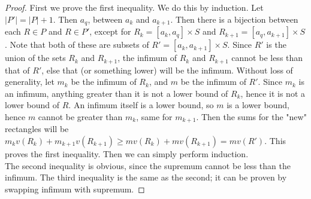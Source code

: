 \documentclass[12pt]{article}
\begin{document}
\begin{proof}
    First we prove the first inequality. We do this by induction. Let $|P'| = |P| + 1$. Then $a_q$, between $a_k$ and $a_{k+1}$. Then there is a bijection between each $R\in P$ and $R \in P'$, except for $R_k = [a_k,a_q] \times S$ and $R_{k+1} = [a_q,a_{k+1}] \times S$. Note that both of these are subsets of $R' = [a_k,a_{k+1}] \times S$. Since $R'$ is the union of the sets $R_k$ and $R_{k+1}$, the infimum of $R_k$ and $R_{k+1}$ cannot be less than that of $R'$, else that (or something lower) will be the infimum. Without loss of generality, let $m_k$ be the infimum of $R_k$, and $m$ be the infimum of $R'$. Since $m_k$ is an infimum, anything greater than it is not a lower bound of $R_k$, hence it is not a lower bound of $R$. An infimum itself is a lower bound, so $m$ is a lower bound, hence $m$ cannot be greater than $m_k$, same for $m_{k+1}$. Then the sums for the "new" rectangles will be $m_kv(R_k) + m_{k+1}v(R_{k+1}) \geq mv(R_k) + mv(R_{k+1}) = mv(R')$. This proves the first inequality. Then we can simply perform induction. \\
    The second inequality is obvious, since the supremum cannot be less than the infimum. The third inequality is the same as the second; it can be proven by swapping infimum with supremum.
\end{proof}
\end{document}
